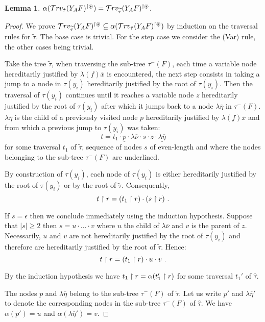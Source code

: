 \documentclass{article}
\newtheorem{lemma}[theorem]{Lemma}
\begin{document}
\begin{lemma}
$\alpha(\mathcal{T}rv_{\hat\tau}(Y_A F)^{\upharpoonright \circledast}) =
\mathcal{T}rv_{\widetilde\tau}(Y_A F)^{\upharpoonright \circledast}$.
\end{lemma}
\begin{proof}
We prove $\mathcal{T}rv_{\widetilde\tau}(Y_A F)^{\upharpoonright \circledast} \subseteq
\alpha(\mathcal{T}rv_{\hat\tau}(Y_A F)^{\upharpoonright \circledast})$ by induction on
the traversal rules for $\widetilde\tau$. The base case is trivial. For the
step case we consider the (Var) rule, the other cases being trivial.

Take the tree $\widetilde\tau$, when traversing the sub-tree $\tau^-(F)$, each time a variable node hereditarily justified by $\lambda (f) \overline{x}$ is encountered, the next step consists in taking a jump to a node in $\tau(y_i)$ hereditarily justified by the root of $\tau(y_i)$. Then the traversal of $\tau(y_i)$ continues until it reaches a variable node $z$ hereditarily justified by the root of $\tau(y_i)$ after which it jumps back to a node $\lambda \overline{\eta}$ in $\tau^-(F)$. $\lambda \overline{\eta}$ is the child of a previously visited node $p$ hereditarily justified by $\lambda (f) \overline{x}$ and from which a previous jump to $\tau(y_i)$ was taken:
$$ t = t_1 \cdot \underline{p} \cdot \lambda \overline{\nu} \cdot s \cdot z \cdot \underline{\lambda \overline{\eta}}$$
for some traversal $t_1$ of $\widetilde\tau$, sequence of nodes $s$ of even-length and where the nodes belonging to the sub-tree $\tau^-(F)$ are underlined.

By construction of $\tau(y_i)$, each node of $\tau(y_i)$ is either hereditarily justified by the root of $\tau(y_i)$
or by the root of $\widetilde\tau$. Consequently,
$$ t\upharpoonright r = (t_1\upharpoonright r) \cdot  (s \upharpoonright r) \ .$$

If $s = \epsilon$ then we conclude immediately using the induction hypothesis.
Suppose that $|s|\geq 2$ then $s = u\cdot \ldots \cdot v$ where $u$ the child of $\lambda \overline{\nu}$ and $v$ is the parent of $z$.
Necessarily, $u$ and $v$ are not hereditarily justified by the root of $\tau(y_i)$ and therefore are hereditarily justified by the root of $\widetilde\tau$. Hence:
$$ t\upharpoonright r = (t_1\upharpoonright r) \cdot  u \cdot v \ .$$

By the  induction hypothesis we have $t_1\upharpoonright r =
\alpha(t_1'\upharpoonright r)$ for some traversal $t_1'$  of $\hat\tau$.

The nodes $p$ and $\lambda \overline{\eta}$ belong
to the sub-tree $\tau^-(F)$ of $\widetilde\tau$. Let us write $p'$ and $\lambda \overline{\eta}'$ to denote the corresponding nodes in the sub-tree $\tau^-(F)$ of $\hat\tau$. We have $\alpha(p') = u$ and $\alpha(\lambda \overline{\eta}') = v$.


\end{proof}
\end{document}
